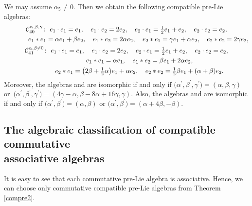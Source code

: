 \documentclass[pdftex]{sigma}
\numberwithin{equation}{section}
\begin{document}
We may assume $\alpha _{5}\neq 0$. Then we obtain the following compatible
pre-Lie algebras:
\begin{gather*}
\mathcal{C}_{40}^{\alpha ,\beta ,\gamma } \colon \
e_{1}\cdot e_{1}=e_{1}, \quad e_{1}\cdot e_{2}=2e_{2} , \quad e_{2}\cdot e_{1}=%
\tfrac{1}{2}e_{1}+e_{2},\quad e_{2}\cdot e_{2}=e_{2} , \\
\hphantom{\mathcal{C}_{40}^{\alpha ,\beta ,\gamma } \colon} \
e_{1}\ast e_{1}=\alpha e_{1}+\beta e_{2} , \quad e_{1}\ast e_{2}=2\alpha e_{2},
 \quad e_{2}\ast e_{1}=\gamma e_{1}+\alpha e_{2} , \quad e_{2}\ast e_{2}=2\gamma
e_{2},\\
\mathcal{C}_{41}^{\alpha ,\beta \neq 0} \colon \
 e_{1}\cdot e_{1}=e_{1} , \quad e_{1}\cdot e_{2}=2e_{2} , \quad e_{2}\cdot e_{1}=%
\tfrac{1}{2}e_{1}+e_{2} , \quad e_{2}\cdot e_{2}=e_{2} , \\
\hphantom{\mathcal{C}_{41}^{\alpha ,\beta \neq 0} \colon} \
 e_{1}\ast e_{1}=\alpha e_{1} ,\quad
 e_{1}\ast e_{2}=\beta e_{1}+2\alpha e_{2},
 \\
\hphantom{\mathcal{C}_{41}^{\alpha ,\beta \neq 0} \colon} \
 e_{2}\ast e_{1}=\bigl( 2\beta +\tfrac{1}{2}\alpha \bigr) e_{1}+\alpha
e_{2} , \quad e_{2}\ast e_{2}=\tfrac{1}{2}\beta e_{1}+( \alpha +\beta
) e_{2}.
\end{gather*}
Moreover, the algebras  and \smash{$\mathcal{C}%
_{40}^{\alpha ^{\prime },\beta ^{\prime },\gamma ^{\prime }}$} are isomorphic
if and only if
$\bigl( \alpha ^{\prime },\beta ^{\prime },\gamma ^{\prime
}\bigr) =( \alpha ,\beta ,\gamma )$ or~${\bigl( \alpha ^{\prime
},\beta ^{\prime },\gamma ^{\prime }\bigr) =( 4\gamma -\alpha ,\beta
-8\alpha +16\gamma ,\gamma )}$.
Also, the algebras \smash{$\mathcal{C}%
_{41}^{\alpha ,\beta }$} and 
are isomorphic if and only if
$
\bigl( \alpha ^{\prime },\beta ^{\prime
}\bigr) =( \alpha ,\beta ) $ or $\bigl( \alpha ^{\prime },\beta
^{\prime }\bigr) =( \alpha +4\beta ,-\beta )$.


\subsection[The algebraic classification of compatible commutative associative algebras]{The algebraic classification of compatible commutative\\ associative algebras}
It is easy to see that each commutative pre-Lie algebra is associative.
Hence, we can choose only commutative compatible pre-Lie algebras from Theorem \ref{compre2}.
\end{document}

